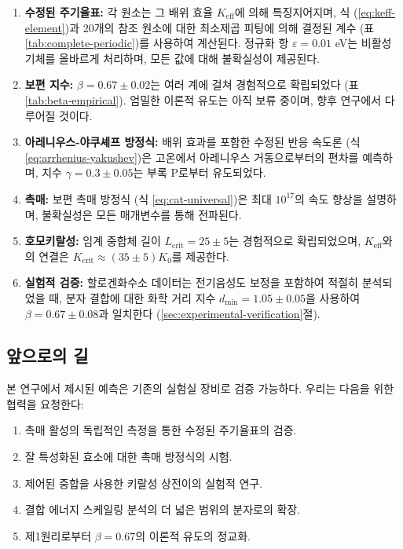 \documentclass[12pt,a4paper]{article}
\newcommand{\Keff}{K_{\mathrm{eff}}}
\newcommand{\Kcrit}{K_{\mathrm{crit}}}
\begin{document}
	\begin{enumerate}
		\item \textbf{수정된 주기율표:} 각 원소는 그 배위 효율 $\Keff$에 의해 특징지어지며, 식 (\ref{eq:keff-element})과 20개의 참조 원소에 대한 최소제곱 피팅에 의해 결정된 계수 (표 \ref{tab:complete-periodic})를 사용하여 계산된다. 정규화 항 $\varepsilon = 0.01$ eV는 비활성 기체를 올바르게 처리하며, 모든 값에 대해 불확실성이 제공된다.
		\item \textbf{보편 지수:} $\beta = 0.67 \pm 0.02$는 여러 계에 걸쳐 경험적으로 확립되었다 (표 \ref{tab:beta-empirical}). 엄밀한 이론적 유도는 아직 보류 중이며, 향후 연구에서 다루어질 것이다.
		\item \textbf{아레니우스-야쿠셰프 방정식:} 배위 효과를 포함한 수정된 반응 속도론 (식 \ref{eq:arrhenius-yakushev})은 고온에서 아레니우스 거동으로부터의 편차를 예측하며, 지수 $\gamma = 0.3 \pm 0.05$는 부록 P로부터 유도되었다.
		\item \textbf{촉매:} 보편 촉매 방정식 (식 \ref{eq:cat-universal})은 최대 $10^{17}$의 속도 향상을 설명하며, 불확실성은 모든 매개변수를 통해 전파된다.
		\item \textbf{호모키랄성:} 임계 중합체 길이 $L_{\text{crit}} = 25 \pm 5$는 경험적으로 확립되었으며, $\Keff$와의 연결은 $\Kcrit \approx (35 \pm 5) K_0$를 제공한다.
		\item \textbf{실험적 검증:} 할로겐화수소 데이터는 전기음성도 보정을 포함하여 적절히 분석되었을 때, 분자 결합에 대한 화학 거리 지수 $d_{\text{min}} = 1.05 \pm 0.05$을 사용하여 $\beta = 0.67 \pm 0.08$과 일치한다 (\ref{sec:experimental-verification}절).
	\end{enumerate}
	
	\subsection{앞으로의 길}
	
	본 연구에서 제시된 예측은 기존의 실험실 장비로 검증 가능하다. 우리는 다음을 위한 협력을 요청한다:
	\begin{enumerate}
		\item 촉매 활성의 독립적인 측정을 통한 수정된 주기율표의 검증.
		\item 잘 특성화된 효소에 대한 촉매 방정식의 시험.
		\item 제어된 중합을 사용한 키랄성 상전이의 실험적 연구.
		\item 결합 에너지 스케일링 분석의 더 넓은 범위의 분자로의 확장.
		\item 제1원리로부터 $\beta = 0.67$의 이론적 유도의 정교화.
	\end{enumerate}
	
\end{document}
